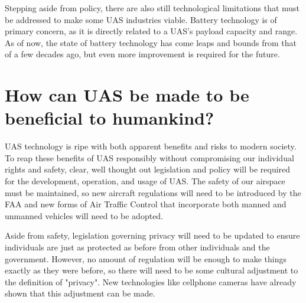 \documentclass[]{aiaa-tc}%
\begin{document}
Stepping aside from policy, there are also still technological limitations that must be addressed to make some UAS industries viable.  Battery technology is of primary concern, as it is directly related to a UAS's payload capacity and range.  As of now, the state of battery technology has come leaps and bounds from that of a few decades ago, but even more improvement is required for the future.

\section*{How can UAS be made to be beneficial to humankind?}

UAS technology is ripe with both apparent benefits and risks to modern society.  To reap these benefits of UAS responsibly without compromising our individual rights and safety, clear, well thought out legislation and policy will be required for the development, operation, and usage of UAS.  The safety of our airspace must be maintained, so new aircraft regulations will need to be introduced by the FAA and new forms of Air Traffic Control that incorporate both manned and unmanned vehicles will need to be adopted.

Aside from safety, legislation governing privacy will need to be updated to ensure individuals are just as protected as before from other individuals and the government.  However, no amount of regulation will be enough to make things exactly as they were before, so there will need to be some cultural adjustment to the definition of "privacy".  New technologies like cellphone cameras have already shown that this adjustment can be made.
\end{document}
